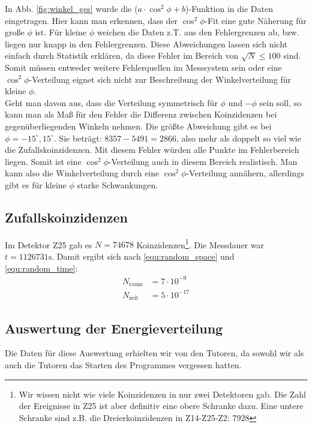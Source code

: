 In Abb. \ref{fig:winkel_ges} wurde die ($a \cdot \cos^2{\phi} + b$)-Funktion in die Daten eingetragen. Hier kann man erkennen, dass der  $\cos^2{\phi}$-Fit eine gute Näherung für große $\phi$ ist. Für kleine $\phi$ weichen die Daten z.T. aus den Fehlergrenzen ab, bzw. liegen nur knapp in den Fehlergrenzen. Diese Abweichungen lassen sich nicht einfach durch Statistik erklären, da diese Fehler im Bereich von $\sqrt{N} \leq 100$ sind. Somit müssen entweder weitere Fehlerquellen im Messsystem sein oder eine $\cos^2{\phi}$-Verteilung eignet sich nicht zur Beschreibung der Winkelverteilung für kleine $\phi$.\\

Geht man davon aus, dass die Verteilung symmetrisch für $\phi$ und $-\phi$ sein soll, so kann man als Maß für den Fehler die Differenz zwischen Koinzidenzen bei gegenüberliegenden Winkeln nehmen. Die größte Abweichung gibt es bei $\phi = -15^\circ,15^\circ$. Sie beträgt: $8357
 - 5491 = 2866$, also mehr als doppelt so viel wie die Zufallskoinzidenzen. Mit diesem Fehler würden alle Punkte im Fehlerbereich liegen. Somit ist eine $\cos^2{\phi}$-Verteilung auch in diesem Bereich realistisch. Man kann also die Winkelverteilung durch eine $\cos^2{\phi}$-Verteilung annähern, allerdings gibt es für kleine $\phi$ starke Schwankungen.\\
 
\subsection{Zufallskoinzidenzen}
Im Detektor Z25 gab es $N = 74678$ Koinzidenzen\footnote{Wir wissen nicht wie viele Koinzidenzen in nur zwei Detektoren gab. Die Zahl der Ereignisse in Z25 ist aber definitiv eine obere Schranke dazu. Eine untere Schranke sind z.B. die Dreierkoinzidenzen in Z14-Z25-Z2: $7928$}. Die Messdauer war $t = 1126731 \si{\second}$. Damit ergibt sich nach \ref{equ:random_space} und \ref{equ:random_time}:\\
\begin{align*}
N_{\text{raum}} &= 7 \cdot 10^{-9}\\
N_{\text{zeit}} &= 5 \cdot 10^{-17}
\end{align*}  
 
\subsection{Auswertung der Energieverteilung}

Die Daten für diese Auswertung erhielten wir von den Tutoren, da sowohl wir als auch die Tutoren das Starten des Programmes vergessen hatten.\\

